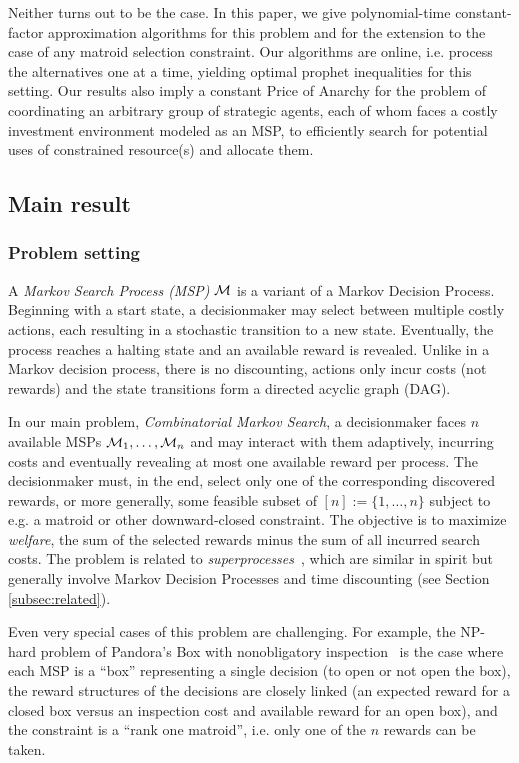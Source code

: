 Neither turns out to be the case.
In this paper, we give polynomial-time constant-factor approximation algorithms for this problem and for the extension to the case of any matroid selection constraint.
Our algorithms are online, i.e. process the alternatives one at a time, yielding optimal prophet inequalities for this setting.
Our results also imply a constant Price of Anarchy for the problem of coordinating an arbitrary group of strategic agents, each of whom faces a costly investment environment modeled as an MSP, to efficiently search for potential uses of constrained resource(s) and allocate them.

\subsection{Main result} \label{subsec:intro-main}

\subsubsection{Problem setting}
A \emph{Markov Search Process (MSP)} $\mathcal{M}$ is a variant of a Markov Decision Process.
Beginning with a start state, a decisionmaker may select between multiple costly actions, each resulting in a stochastic transition to a new state.
Eventually, the process reaches a halting state and an available reward is revealed.
Unlike in a Markov decision process, there is no discounting, actions only incur costs (not rewards) and the state transitions form a directed acyclic graph (DAG).

In our main problem, \emph{Combinatorial Markov Search}, a decisionmaker faces $n$ available MSPs $\mathcal{M}_1,\dots,\mathcal{M}_n$ and may interact with them adaptively, incurring costs and eventually revealing at most one available reward per process.
The decisionmaker must, in the end, select only one of the corresponding discovered rewards, or more generally, some feasible subset of $[n] := \{1,\dots,n\}$ subject to e.g. a matroid or other downward-closed constraint.
The objective is to maximize \emph{welfare}, the sum of the selected rewards minus the sum of all incurred search costs.
The problem is related to \emph{superprocesses}~\citep{nash1973optimal}, which are similar in spirit but generally involve Markov Decision Processes and time discounting (see Section \ref{subsec:related}).

Even very special cases of this problem are challenging.
For example, the NP-hard problem of Pandora's Box with nonobligatory inspection~\citep{fu2023pandora,beyhaghi2023pandora} is the case where each MSP is a ``box'' representing a single decision (to open or not open the box), the reward structures of the decisions are closely linked (an expected reward for a closed box versus an inspection cost and available reward for an open box), and the constraint is a ``rank one matroid'', i.e. only one of the $n$ rewards can be taken.

